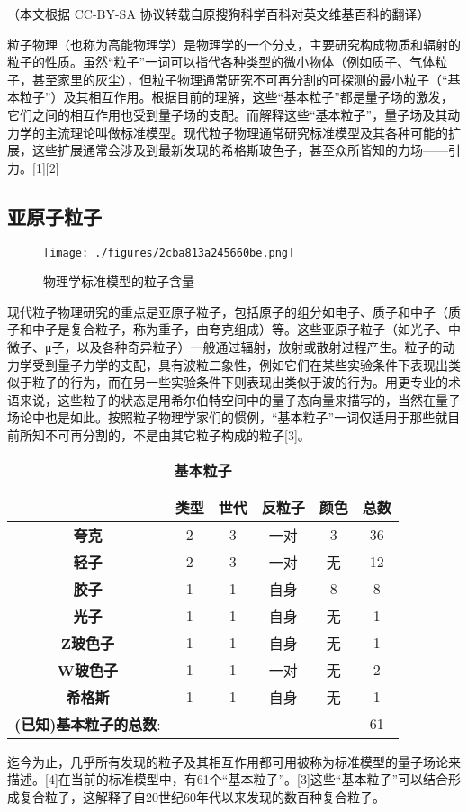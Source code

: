 
（本文根据 CC-BY-SA 协议转载自原搜狗科学百科对英文维基百科的翻译）

粒子物理（也称为高能物理学）是物理学的一个分支，主要研究构成物质和辐射的粒子的性质。虽然“粒子”一词可以指代各种类型的微小物体（例如质子、气体粒子，甚至家里的灰尘），但粒子物理通常研究不可再分割的可探测的最小粒子（“基本粒子”）及其相互作用。根据目前的理解，这些“基本粒子”都是量子场的激发，它们之间的相互作用也受到量子场的支配。而解释这些“基本粒子”，量子场及其动力学的主流理论叫做标准模型。现代粒子物理通常研究标准模型及其各种可能的扩展，这些扩展通常会涉及到最新发现的希格斯玻色子，甚至众所皆知的力场——引力。[1][2]

\subsection{亚原子粒子}
\begin{figure}[ht]
\centering
\texttt{[image: ./figures/2cba813a245660be.png]}
\caption{物理学标准模型的粒子含量} \label{fig_GNWL_1}
\end{figure}

现代粒子物理研究的重点是亚原子粒子，包括原子的组分如电子、质子和中子（质子和中子是复合粒子，称为重子，由夸克组成）等。这些亚原子粒子（如光子、中微子、μ子，以及各种奇异粒子）一般通过辐射，放射或散射过程产生。粒子的动力学受到量子力学的支配，具有波粒二象性，例如它们在某些实验条件下表现出类似于粒子的行为，而在另一些实验条件下则表现出类似于波的行为。用更专业的术语来说，这些粒子的状态是用希尔伯特空间中的量子态向量来描写的，当然在量子场论中也是如此。按照粒子物理学家们的惯例，“基本粒子”一词仅适用于那些就目前所知不可再分割的，不是由其它粒子构成的粒子[3]。

\begin{table}[ht]
\centering
\caption{\textbf{基本粒子}}\label{tab_GNWL}
\begin{tabular}{|c|c|c|c|c|c}
\hline
 &\textbf{类型}&\textbf{世代}&\textbf{反粒子}&\textbf{颜色}& \textbf{总数} \\
\hline
\textbf{夸克}& 2 & 3 & 一对 & 3 & 36 \\
\hline
\textbf{轻子}& 2 & 3 & 一对 & 无 & 12 \\
\hline
\textbf{胶子}& 1 & 1 & 自身 & 8 & 8 \\
\hline
\textbf{光子}& 1 & 1 & 自身 & 无 & 1 \\
\hline
\textbf{Z玻色子}& 1 & 1 & 自身 & 无 & 1 \\
\hline
\textbf{W玻色子}& 1 & 1 & 一对 & 无 & 2 \\
\hline
\textbf{希格斯}& 1 & 1 & 自身 & 无 & 1 \\
\hline
\textbf{(已知)基本粒子的总数}: & & & & &61\\
\hline
\end{tabular}
\end{table}
迄今为止，几乎所有发现的粒子及其相互作用都可用被称为标准模型的量子场论来描述。[4]在当前的标准模型中，有61个“基本粒子”。[3]这些“基本粒子”可以结合形成复合粒子，这解释了自20世纪60年代以来发现的数百种复合粒子。

